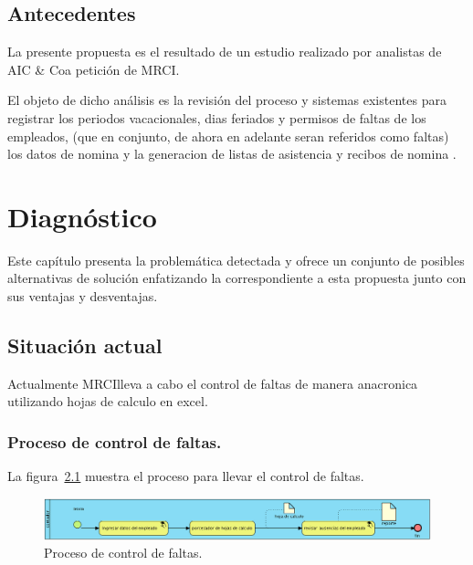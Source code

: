 \documentclass[10pt]{book}
\newcommand{\empresa}{AIC \& Co}
\newcommand{\cliente}{MRCI}
\begin{document}
	
\section{Antecedentes} 


	La presente propuesta es el resultado de un estudio realizado por analistas de \empresa a petición de \cliente.
	
	El objeto de dicho análisis es la revisión del proceso y sistemas existentes para registrar los periodos vacacionales, dias feriados y permisos de faltas de los empleados, (que en conjunto, de ahora en adelante seran referidos como faltas) los datos de nomina y la generacion de listas de asistencia y recibos de nomina . 
	





\chapter{Diagnóstico} 

	Este capítulo presenta la problemática detectada y ofrece un conjunto de posibles alternativas de solución enfatizando la correspondiente a esta propuesta junto con sus ventajas y desventajas.
	
\section{Situación actual}

	Actualmente \cliente lleva a cabo el control de faltas de manera anacronica utilizando hojas de calculo en excel.
	
\subsection{Proceso de control de faltas.}

	La figura~\ref{fig:procesoLic} muestra el proceso para llevar el control de faltas.

\begin{figure}[htbp!]
	\begin{center}
		\includegraphics[width=\textwidth]{images/procesoLic}
		\caption{Proceso de control de faltas.}
		\label{fig:procesoLic}
	\end{center}
\end{figure}
\end{document}
